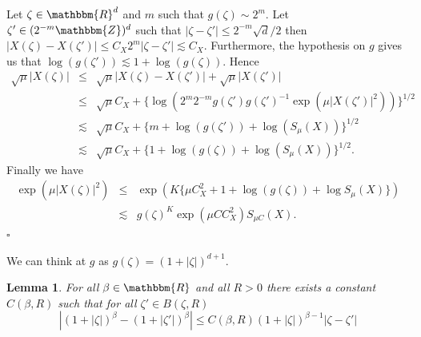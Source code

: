 \documentclass[a4paper,11pt]{article}
\newtheorem{lemma}[theorem]{Lemma}
\newenvironment{proof}{{\sc Proof.}}{\hfill$\square$}
\begin{document}
\begin{proof}
  Let $\zeta \in \mathbbm{R}^{d}$ and $m$ such that $g ( \zeta ) \sim 2^{m}$.
  Let $\zeta' \in ( 2^{-m} \mathbbm{Z} )^{d}$ such that $| \zeta - \zeta' |
  \leqslant 2^{-m} \sqrt{d} /2$ then
  $ | X ( \zeta ) -X ( \zeta' ) | \leqslant C_{X} 2^{m} | \zeta - \zeta' |
     \lesssim C_{X} $. 
  Furthermore, the hypothesis on $g$ gives us that $\log ( g ( \zeta' ) )
  \lesssim 1+ \log ( g ( \zeta ) )$. Hence
  \begin{eqnarray*}
    \sqrt{\mu} | X ( \zeta ) | & \leqslant & \sqrt{\mu} | X ( \zeta ) -X (
    \zeta' ) | + \sqrt{\mu} | X ( \zeta' ) |\\
    & \leqslant & \sqrt{\mu} C_{X} + \{ \log (^{} 2^{m} 2^{-m} g ( \zeta' ) g
    ( \zeta' )^{-1} \exp ( \mu | X ( \zeta' ) |^{2} ) ) \}^{1/2}\\
    & \lesssim & \sqrt{\mu} C_{X} + \{ m+ \log ( g ( \zeta' ) ) + \log (
    S_{\mu} ( X ) ) \}^{1/2}\\
    & \lesssim & \sqrt{\mu} C_{X} + \{ 1+ \log ( g ( \zeta ) ) + \log (
    S_{\mu} ( X ) ) \}^{1/2} .
  \end{eqnarray*}
  Finally we have
  \begin{eqnarray*}
    \exp ( \mu | X ( \zeta ) |^{2} ) & \leqslant & \exp ( K \{ \mu C_{X}^{2}
    +1+ \log ( g ( \zeta ) ) + \log  S_{\mu} ( X ) \} )\\
    & \lesssim & g ( \zeta )^{K} \exp ( \mu C C_{X}^{2} ) S_{\mu C} ( X ) .
  \end{eqnarray*}
\end{proof}

We can think at $g$ as $g ( \zeta ) = ( 1+ | \zeta | )^{d+1}$.

\begin{lemma}
  \label{lemma_holder_Y}For all $\beta \in \mathbbm{R}$ and all $R>0$ there
  exists a constant $C ( \beta ,R )$ such that for all $\zeta' \in B ( \zeta
  ,R )$
  \[ | ( 1+ | \zeta | )^{\beta} - ( 1+ | \zeta' | )^{\beta} | \leqslant C (
     \beta ,R ) ( 1+ | \zeta | )^{\beta -1} | \zeta - \zeta' | \]
\end{lemma}
\end{document}
